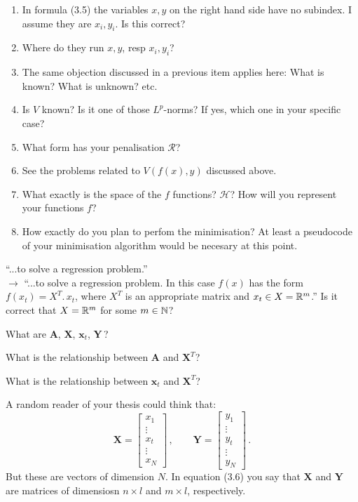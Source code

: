 \begin{description}[style=unboxed,leftmargin=0cm,itemsep=3ex]
\begin{enumerate}
\item
In formula (3.5) the variables $x,y$ on the right hand side have no
subindex. I assume they are $x_i,y_i$. Is this correct?
\item
Where do they run $x,y$, resp $x_i,y_i$?
\item
The same objection discussed in a previous item applies here:
What is known? What is unknown? etc.
\item
Is $V$ known? Is it one of those $L^p$-norms? If yes, which one in
your specific case?
\item
What form has your penalisation $\mathcal{R}$?
\item
See the problems related to $V(f(x),y)$ discussed above.
\item
What exactly is the space of the $f$ functions?
$\mathcal{H}$?
How will you represent your functions $f$?
\item
How exactly do you plan to perfom the minimisation?
At least a pseudocode of your minimisation algorithm would be necesary
at this point.
\end{enumerate}

``...to solve a regression problem.'' \\
\quad$\rightarrow$\quad
``...to solve a  regression problem. 
In this case $f(x)$ has the form $f(x_t)=X^T.\,x_t$, where $X^T$ is an
appropriate matrix and $x_t\in X={\mathbb R }^m$.''
Is it correct that $X={\mathbb R }^m$ for some $m\in{\mathbb N }$?

What are $\mathbf{A}$, $\mathbf{X}$, $\mathbf{x}_t$, $\mathbf{Y}$\,?

What is the relationship between $\mathbf{A}$ and $\mathbf{X}^T$?

What is the relationship between $\mathbf{x}_t$ and $\mathbf{X}^T$?

A random reader of your thesis could think that:
$$
\mathbf{X} 
= \begin{bmatrix} x_1 \\ \vdots \\ x_t \\ \vdots \\ x_N \end{bmatrix}\,,
\qquad
\mathbf{Y} 
= \begin{bmatrix} y_1 \\ \vdots \\ y_t \\ \vdots \\ y_N \end{bmatrix}\,.
$$
But these are vectors of dimension $N$.
In equation (3.6) you say that $\mathbf{X}$ and $\mathbf{Y}$ are matrices
of dimensiosn $n\times l$ and $m\times l$, respectively.


\end{description}
